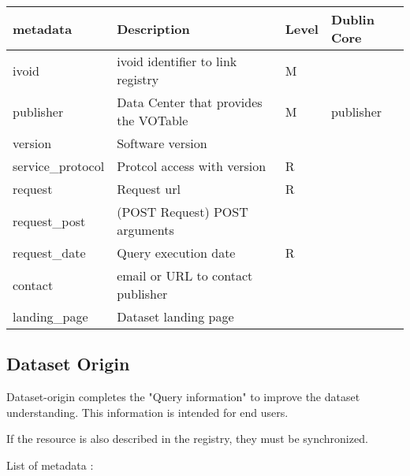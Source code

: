 \documentclass[11pt,a4paper]{ivoa}
\begin{document}
\begin{tabular}{|l|l|l|l|}  \hline
\textbf{metadata} & \textbf{Description} & \textbf{Level} & \textbf{Dublin Core}\\ \hline
ivoid             & ivoid identifier to link registry & M &  \\ \hline
publisher         & Data Center that provides the VOTable & M & publisher\\ \hline
version           & Software version  & & \\ \hline
service\_protocol & Protcol access with version & R& \\ \hline
request           & Request url &  R& \\ \hline 
request\_post     & (POST Request) POST arguments &  & \\ \hline 
request\_date     & Query execution date & R&\\ \hline	 
contact           & email or URL to contact publisher & & \\ \hline	 
landing\_page     & Dataset landing page & & \\ \hline
\end{tabular}


\subsection{Dataset Origin}
Dataset-origin completes the "Query information" to improve the dataset understanding. This information is intended for end users.

If the resource is also described in the registry, they must be synchronized.

List of metadata :\\
\end{document}
